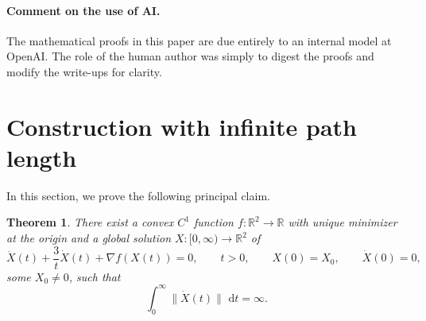 \documentclass{article}
\newtheorem{theorem}{Theorem}[section]
\theoremstyle{remark}
\newcommand{\R}{\mathbb{R}}
\newcommand{\dd}{\,\mathrm{d}}
\begin{document}
\paragraph{Comment on the use of AI.} The mathematical proofs in this paper are due entirely to an internal model at OpenAI. The role of the human author was simply to digest the proofs and modify the write-ups for clarity.






\section{Construction with infinite path length}

In this section, we prove the following principal claim.

\begin{theorem}\label{thm:main}
There exist a convex $C^1$ function $f\colon\R^2\to\R$ with unique minimizer at the origin and a global solution $X\colon[0,\infty)\to\R^2$ of
\[
   \ddot X(t)+\frac{3}{t}\dot X(t)+\nabla f(X(t))=0,
  \qquad t>0,
  \qquad X(0)=X_0,
  \qquad \dot X(0)=0,
\]
some $X_0\neq0$, 
such that
\[
  \int_0^\infty \| \dot X(t)\|\,\dd t=\infty.
\]
\end{theorem}
\end{document}

